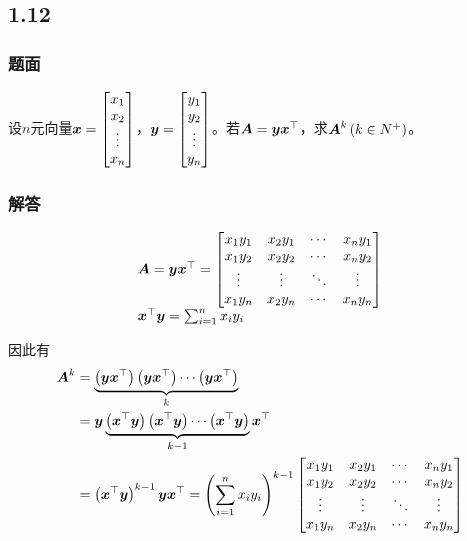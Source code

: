 \documentclass[9pt,xcolor=svgnames]{beamer} %
\begin{document}
\subsection*{1.12}
\begin{frame}
    \frametitle{题面}
    设\(n\)元向量\(\boldsymbol{x}=\begin{bmatrix}x_1\\x_2\\\vdots\\x_n\end{bmatrix}\)，\(\boldsymbol{y}=\begin{bmatrix}y_1\\y_2\\\vdots\\y_n\end{bmatrix}\)。若\(\boldsymbol{A}=\boldsymbol{y}\boldsymbol{x}^\top\)，求\(\boldsymbol{A}^k\left( k \in N^+ \right)\)。
\end{frame}
\begin{frame}[allowframebreaks]
    \frametitle{解答}
    \begin{equation*}
        \begin{array}{lll}
            \boldsymbol{A}=\boldsymbol{y}\boldsymbol{x}^\top=
            \begin{bmatrix}
                x_1y_1 & x_2y_1 & \cdots & x_ny_1 \\
                x_1y_2 & x_2y_2 & \cdots & x_ny_2 \\
                \vdots & \vdots & \ddots & \vdots \\
                x_1y_n & x_2y_n & \cdots & x_ny_n \\
            \end{bmatrix}  \\
            \boldsymbol{x}^\top\boldsymbol{y}=\sum_{i=1}^nx_iy_i \\
        \end{array}
    \end{equation*}

    因此有
    \begin{align*}
        \boldsymbol{A}^k & =\underbrace{\left( \boldsymbol{y}\boldsymbol{x}^\top \right)\left( \boldsymbol{y}\boldsymbol{x}^\top \right)\cdots\left( \boldsymbol{y}\boldsymbol{x}^\top \right)}_k                    \\
                & =\boldsymbol{y}\underbrace{\left( \boldsymbol{x}^\top\boldsymbol{y} \right)\left( \boldsymbol{x}^\top\boldsymbol{y} \right)\cdots\left( \boldsymbol{x}^\top\boldsymbol{y} \right)}_{k-1}\boldsymbol{x}^\top \\
                & =\left( \boldsymbol{x}^\top\boldsymbol{y} \right)^{k-1}\boldsymbol{y}\boldsymbol{x}^\top=\left( \sum_{i=1}^nx_iy_i \right)^{k-1}
        \begin{bmatrix}
            x_1y_1 & x_2y_1 & \cdots & x_ny_1 \\
            x_1y_2 & x_2y_2 & \cdots & x_ny_2 \\
            \vdots & \vdots & \ddots & \vdots \\
            x_1y_n & x_2y_n & \cdots & x_ny_n \\
        \end{bmatrix}
    \end{align*}
\end{frame}
\end{document}

